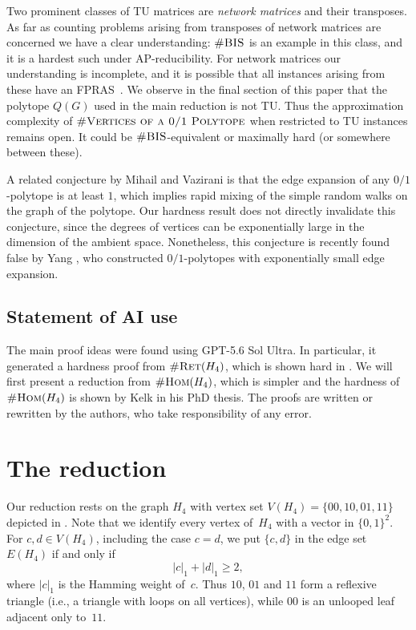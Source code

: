 \documentclass[11pt, oneside]{article}   	%
\def\nBIS{\textsc{\#BIS}}
\def\nRet{\textsc{\#Ret}}
\def\nHom{\textsc{\#Hom}}
\def\nPolytopeVertices{\textsc{\#Vertices of a 0/1 Polytope}}
\newcommand{\abs}[1]{\left\vert#1\right\vert}
\def\Hfour{H_4}
\begin{document}
Two prominent classes of TU matrices are \textit{network matrices} and their transposes.  As far as counting problems arising from transposes of network matrices are concerned we have a clear understanding:  $\nBIS$ is an example in this class, and it is a hardest such under AP-reducibility.  For network matrices our understanding is incomplete, and it is possible that all instances arising from these have an FPRAS~\cite{GuoJerrum}.  We observe in the final section of this paper that the polytope $Q(G)$ used in the main reduction is not TU\null. Thus the approximation complexity of $\nPolytopeVertices$ when restricted to TU instances remains open.  It could be $\nBIS$-equivalent or maximally hard (or somewhere between these). 

A related conjecture by Mihail and Vazirani \cite{MV89} is that the edge expansion of any $0/1$-polytope is at least $1$,
which implies rapid mixing of the simple random walks on the graph of the polytope.
Our hardness result does not directly invalidate this conjecture, since the degrees of vertices can be exponentially large in the dimension of the ambient space.
Nonetheless, this conjecture is recently found false by Yang \cite{Yan26}, who constructed $0/1$-polytopes with exponentially small edge expansion.

\subsection{Statement of AI use}
The main proof ideas were found using GPT-5.6 Sol Ultra.
In particular, it generated a hardness proof from $\nRet(\Hfour)$, which is shown hard in \cite{FGZ21}.
We will first present a reduction from $\nHom(\Hfour)$, which is simpler and the hardness of $\nHom(\Hfour)$ is shown by Kelk \cite{KelkThesis} in his PhD thesis.
The proofs are written or rewritten by the authors, who take responsibility of any error.

\section{The reduction}\label{sec:reduction}

Our reduction rests on the graph $\Hfour$ with vertex set $V(\Hfour)=\{00,10,01,11\}$ depicted in . Note that we identify every vertex of~$\Hfour$ with a vector in $\{0,1\}^2$.  For $c,d\in V(\Hfour)$, including the case $c=d$, we put $\{c,d\}$ in the edge set $E(\Hfour)$ if and only if
\begin{equation}\label{eq:H-adjacency}
 \abs{c}_1+\abs{d}_1\geq2,
\end{equation}
where $\abs{c}_1$ is the Hamming weight of~$c$.  Thus $10$, $01$ and $11$ form a reflexive triangle (i.e., a triangle with loops on all vertices), while $00$ is an unlooped leaf adjacent only to~$11$.
\end{document}
